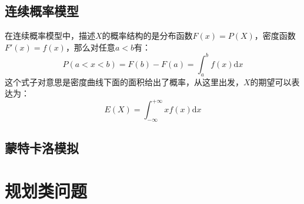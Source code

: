 \documentclass[11pt,a4paper]{article}
\begin{document}
\subsection{连续概率模型}
在连续概率模型中，描述$X$的概率结构的是分布函数$F(x)=P(X)$，密度函数$F'(x)=f(x)$，那么对任意$a<b$有：
\begin{equation*}
P(a<x<b)=F(b)-F(a)=\int_{a}^{b}f(x)\mathrm{d}x
\end{equation*}
这个式子对意思是密度曲线下面的面积给出了概率，从这里出发，$X$的期望可以表达为：
\begin{equation*}
E(X)=\int _{-\infty}^{+\infty}xf(x)\mathrm{d}x
\end{equation*}

\subsection{蒙特卡洛模拟}

\section{规划类问题}
\end{document}

